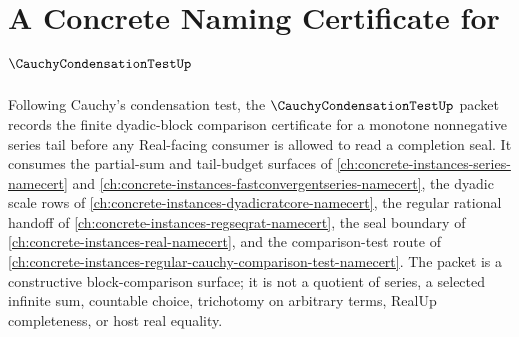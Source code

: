 \chapter{A Concrete Naming Certificate for $\CauchyCondensationTestUp$}
\label{ch:concrete-instances-cauchy-condensation-test-namecert}

Following Cauchy's condensation test, the $\CauchyCondensationTestUp$ packet records the finite dyadic-block comparison certificate for a monotone nonnegative series tail before any Real-facing consumer is allowed to read a completion seal. It consumes the partial-sum and tail-budget surfaces of \autoref{ch:concrete-instances-series-namecert} and \autoref{ch:concrete-instances-fastconvergentseries-namecert}, the dyadic scale rows of \autoref{ch:concrete-instances-dyadicratcore-namecert}, the regular rational handoff of \autoref{ch:concrete-instances-regseqrat-namecert}, the seal boundary of \autoref{ch:concrete-instances-real-namecert}, and the comparison-test route of \autoref{ch:concrete-instances-regular-cauchy-comparison-test-namecert}. The packet is a constructive block-comparison surface; it is not a quotient of series, a selected infinite sum, countable choice, trichotomy on arbitrary terms, RealUp completeness, or host real equality.


